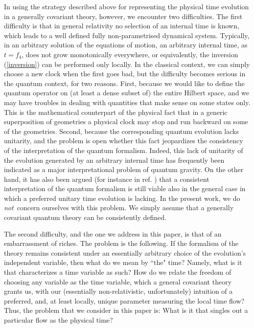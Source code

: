 In using the strategy described above for representing the
physical time evolution in a generally covariant theory, however,
we encounter two difficulties.   The first difficulty is that in
general relativity no selection of an internal time is known,
which leads to a well defined fully non-parametrised dynamical
system.  Typically, in an arbitrary solution of the equations of
motion, an arbitrary internal time, as $t = f_4$, does not grow
monotonically everywhere, or equivalently, the inversion
(\ref{inversion}) can
be performed only locally.    In the classical context, we can
simply choose a new clock when the first goes bad, but the
difficulty becomes serious in the quantum context, for two
reasons.  First, because we would like to define the quantum
operator on (at least a dense subset of) the entire Hilbert space,
and we may have troubles in dealing with quantities that make
sense on some states only. This is the mathematical counterpart
of the physical fact that in a generic superposition of geometries
a physical clock may stop and run backward on some of the
geometries.  Second, because the corresponding quantum
evolution lacks unitarity, and the problem is open whether this
fact jeopardizes the consistency of the interpretation of the
quantum formalism.   Indeed, this lack of unitarity of the
evolution
generated by an arbitrary internal time has frequently been
indicated as a major interpretational problem of
quantum gravity.  On the other hand, it has also been argued (for
instance in ref. \cite{time}) that a consistent interpretation of
the quantum formalism is still viable also in the general case in
which a preferred unitary time evolution is lacking.  In the
present work, we do {\it not\,} concern ourselves with this
problem.   We simply assume that a generally covariant quantum
theory can be consistently defined.

The second difficulty, and the one we address in this paper, is
that of an embarrassment of riches.  The problem is the
following.  If the formalism of the theory remains consistent
under an essentially arbitrary choice of the evolution's
independent variable, then what do we mean by ``the" time?
Namely, what is it that characterizes a time variable as such?
How do we relate the freedom of choosing any variable as the
time variable, which a general covariant theory grants us, with
our (essentially non-relativistic, unfortunately) intuition of a
preferred, and, at least locally, unique parameter measuring the
local time flow?  Thus, the problem that we consider in this
paper is:  What is it that singles out a particular flow as the
physical time?

